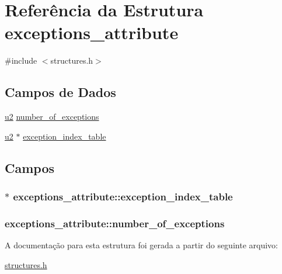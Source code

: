 \hypertarget{structexceptions__attribute}{}\section{Referência da Estrutura exceptions\+\_\+attribute}
\label{structexceptions__attribute}


{\ttfamily \#include $<$structures.\+h$>$}

\subsection*{Campos de Dados}
\begin{DoxyCompactItemize}
\item 
\hyperlink{lista__operandos_8h_a732cde1300aafb73b0ea6c2558a7a54f}{u2} \hyperlink{structexceptions__attribute_acc85fb50930b682cc98d89e2128a065a}{number\+\_\+of\+\_\+exceptions}
\item 
\hyperlink{lista__operandos_8h_a732cde1300aafb73b0ea6c2558a7a54f}{u2} $\ast$ \hyperlink{structexceptions__attribute_ae7a712d07214e739d25465f9806c514f}{exception\+\_\+index\+\_\+table}
\end{DoxyCompactItemize}


\subsection{Campos}
\subsubsection[{\texorpdfstring{exception\+\_\+index\+\_\+table}{exception_index_table}}]{$\ast$ exceptions\+\_\+attribute\+::exception\+\_\+index\+\_\+table}\hypertarget{structexceptions__attribute_ae7a712d07214e739d25465f9806c514f}{}\label{structexceptions__attribute_ae7a712d07214e739d25465f9806c514f}
\subsubsection[{\texorpdfstring{number\+\_\+of\+\_\+exceptions}{number_of_exceptions}}]{ exceptions\+\_\+attribute\+::number\+\_\+of\+\_\+exceptions}\hypertarget{structexceptions__attribute_acc85fb50930b682cc98d89e2128a065a}{}\label{structexceptions__attribute_acc85fb50930b682cc98d89e2128a065a}


A documentação para esta estrutura foi gerada a partir do seguinte arquivo\+:\begin{DoxyCompactItemize}
\item 
\hyperlink{structures_8h}{structures.\+h}\end{DoxyCompactItemize}
